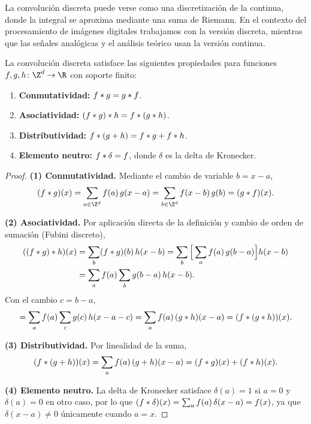 La convoluci\'on discreta puede verse como una discretizaci\'on de la continua,
donde la integral se aproxima mediante una suma de Riemann. En el contexto del
procesamiento de im\'agenes digitales trabajamos con la versi\'on discreta,
mientras que las se\~nales anal\'ogicas y el an\'alisis te\'orico usan la
versi\'on continua.

\begin{proposition}
\label{prop:grids:algebra}
La convoluci\'on discreta satisface las siguientes propiedades para funciones
$f, g, h \colon \Z^d \to \R$ con soporte finito:
\begin{enumerate}
  \item \textbf{Conmutatividad:} $f * g = g * f$.
  \item \textbf{Asociatividad:} $(f * g) * h = f * (g * h)$.
  \item \textbf{Distributividad:} $f * (g + h) = f * g + f * h$.
  \item \textbf{Elemento neutro:} $f * \delta = f$, donde $\delta$ es la
    delta de Kronecker.
\end{enumerate}
\end{proposition}

\begin{proof}
\textbf{(1) Conmutatividad.} Mediante el cambio de variable $b = x - a$,
\[
  (f \conv g)(x) = \sum_{a \in \Z^d} f(a)\,g(x - a)
   = \sum_{b \in \Z^d} f(x - b)\,g(b) = (g \conv f)(x).
\]

\textbf{(2) Asociatividad.} Por aplicaci\'on directa de la definici\'on y cambio
de orden de sumaci\'on (Fubini discreto),
\begin{align}
((f * g) * h)(x)
  &= \sum_{b} (f * g)(b)\,h(x - b)
   = \sum_{b} \Big[\sum_{a} f(a)\,g(b - a)\Big] h(x - b) \nonumber \\
  &= \sum_{a} f(a) \sum_{b} g(b - a)\,h(x - b).
\end{align}
Con el cambio $c = b - a$,
\[
  = \sum_{a} f(a) \sum_{c} g(c)\,h(x - a - c)
   = \sum_{a} f(a)\,(g * h)(x - a) = (f * (g * h))(x).
\]

\textbf{(3) Distributividad.} Por linealidad de la suma,
\[
  (f * (g + h))(x) = \sum_{a} f(a)\,(g + h)(x - a)
   = (f * g)(x) + (f * h)(x).
\]

\textbf{(4) Elemento neutro.} La delta de Kronecker satisface $\delta(a) = 1$
si $a = 0$ y $\delta(a) = 0$ en otro caso, por lo que
$(f * \delta)(x) = \sum_a f(a)\,\delta(x-a) = f(x)$, ya que
$\delta(x - a) \neq 0$ \'unicamente cuando $a = x$.
\end{proof}

